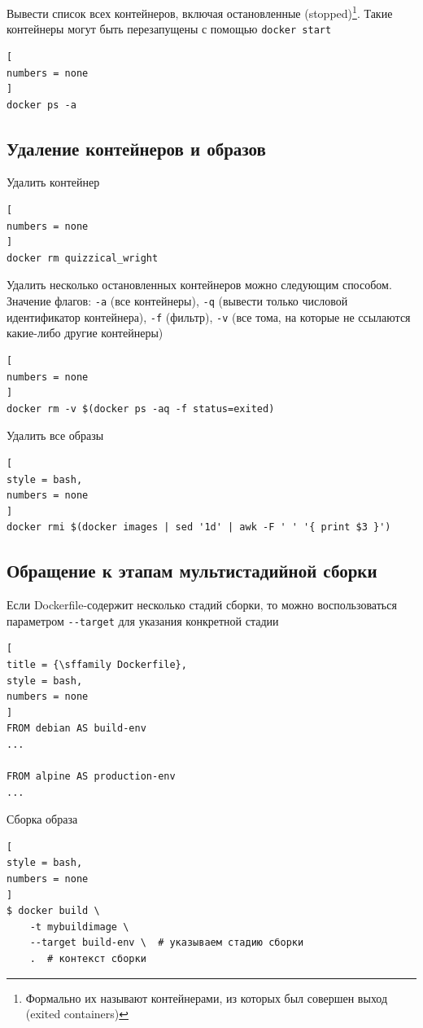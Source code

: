 \documentclass[%
	11pt,
	a4paper,
	utf8,
		]{article}
\begin{document}
Вывести список всех контейнеров, включая остановленные (stopped)\footnote{Формально их называют контейнерами, из которых был совершен выход (exited containers)}. Такие контейнеры могут быть перезапущены с помощью \texttt{docker start}

\begin{lstlisting}[
numbers = none
]
docker ps -a
\end{lstlisting}

\subsection{Удаление контейнеров и образов}

Удалить контейнер 

\begin{lstlisting}[
numbers = none
]
docker rm quizzical_wright
\end{lstlisting}

Удалить несколько остановленных контейнеров можно следующим способом. Значение флагов: \texttt{-a} (все контейнеры), \texttt{-q} (вывести только числовой идентификатор контейнера), \texttt{-f} (фильтр), \texttt{-v} (все тома, на которые не ссылаются какие-либо другие контейнеры)

\begin{lstlisting}[
numbers = none
]
docker rm -v $(docker ps -aq -f status=exited)
\end{lstlisting}

Удалить все образы 
\begin{lstlisting}[
style = bash,
numbers = none
]
docker rmi $(docker images | sed '1d' | awk -F ' ' '{ print $3 }')
\end{lstlisting}

\subsection{Обращение к этапам мультистадийной сборки}

Если Dockerfile-содержит несколько стадий сборки, то можно воспользоваться параметром \verb*|--target| для указания конкретной стадии
\begin{lstlisting}[
title = {\sffamily Dockerfile},
style = bash,
numbers = none
]
FROM debian AS build-env
...

FROM alpine AS production-env
...
\end{lstlisting}

Сборка образа
\begin{lstlisting}[
style = bash,
numbers = none
]
$ docker build \
    -t mybuildimage \
    --target build-env \  # указываем стадию сборки
    .  # контекст сборки
\end{lstlisting}
\end{document}
